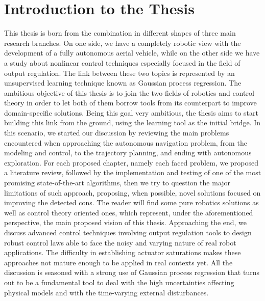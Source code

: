 \chapter*{Introduction to the Thesis}%
\label{CH:GENERAL-INTRODUCTION}

This thesis is born from the combination in different shapes of three main research branches.
On one side, we have a completely robotic view with the development of a fully autonomous aerial vehicle, while
on the other side we have a study about nonlinear control techniques especially focused in the field
of output regulation. The link between these two topics is represented by an unsupervised learning technique
known as Gaussian process regression. The ambitious objective of this thesis is to join the two fields of robotics
and control theory in order to let both of them borrow tools from its counterpart to improve domain-specific solutions.
Being this goal very ambitious, the thesis aims to start building this link from the ground, using the
learning tool as the initial bridge. In this scenario, we started our discussion by reviewing the main problems
encountered when approaching the autonomous navigation problem, from the modeling and control, to the trajectory planning,
and ending with autonomous exploration. For each proposed chapter, namely each faced problem, we proposed a literature
review, followed by the implementation and testing of one of the most promising state-of-the-art
algorithms, then we try to question the major limitations of such approach, proposing, when possible,
novel solutions focused on improving the detected cons. The reader will find some pure robotics solutions as well
as control theory oriented ones, which represent, under the aforementioned perspective, the main proposed vision of this thesis.
Approaching the end, we discuss advanced control techniques involving output regulation tools to design robust
control laws able to face the noisy and varying nature of real robot applications.
The difficulty in establishing actuator saturations makes these approaches not mature enough to be applied in
real contexts yet. All the discussion is seasoned with a strong use of Gaussian process regression that turns out to be 
a fundamental tool to deal with the high uncertainties affecting physical models and with the time-varying
external disturbances.

